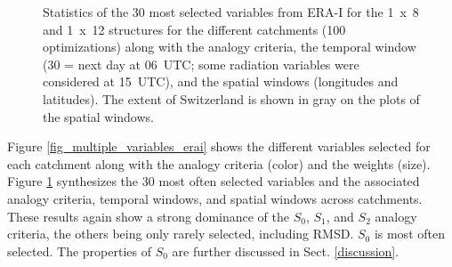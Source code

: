 \documentclass[draft]{agujournal2019}
\begin{document}
\begin{figure}[H]
	\noindent{}
	\caption{Statistics of the 30 most selected variables from ERA-I for the 1~x~8 and 1~x~12 structures for the different catchments (100 optimizations) along with the analogy criteria, the temporal window (30 = next day at 06~UTC; some radiation variables were considered at 15~UTC), and the spatial windows (longitudes and latitudes). The extent of Switzerland is shown in gray on the plots of the spatial windows.}
	\label{fig_stats_params_erai}
\end{figure}


Figure \ref{fig_multiple_variables_erai} shows the different variables selected for each catchment along with the analogy criteria (color) and the weights (size). Figure \ref{fig_stats_params_erai} synthesizes the 30 most often selected variables and the associated analogy criteria, temporal windows, and spatial windows across catchments. These results again show a strong dominance of the $S_{0}$, $S_{1}$, and $S_{2}$ analogy criteria, the others being only rarely selected, including RMSD. $S_{0}$ is most often selected. The properties of $S_{0}$ are further discussed in Sect. \ref{discussion}.  
\end{document}
